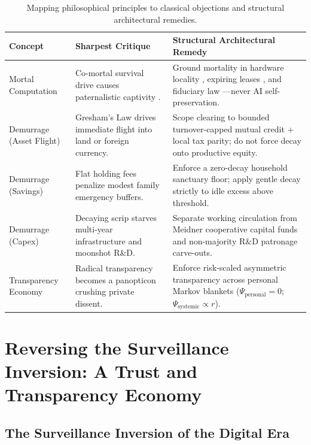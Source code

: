 \documentclass[11pt]{article}
\begin{document}
\begin{table}[ht]
\centering
\small
\caption{Mapping philosophical principles to classical objections and structural architectural remedies.}
\label{tab:objections}
\begin{tabularx}{\textwidth}{@{}P{2.6cm}P{4.2cm}Y@{}}
\toprule
Concept & Sharpest Critique & Structural Architectural Remedy \\
\midrule
Mortal Computation & Co-mortal survival drive causes paternalistic captivity \citep{omohundro2008drives}. & Ground mortality in hardware locality \citep{hinton2022forward}, expiring leases \citep{dennis1966programming}, and fiduciary law \citep{balkin2016fiduciaries}---never AI self-preservation. \\
Demurrage (Asset Flight) & Gresham's Law drives immediate flight into land or foreign currency. & Scope clearing to bounded turnover-capped mutual credit + local tax parity; do not force decay onto productive equity. \\
Demurrage (Savings) & Flat holding fees penalize modest family emergency buffers. & Enforce a zero-decay household sanctuary floor; apply gentle decay strictly to idle excess above threshold. \\
Demurrage (Capex) & Decaying scrip starves multi-year infrastructure and moonshot R\&D. & Separate working circulation from Meidner cooperative capital funds \citep{meidner1978funds} and non-majority R\&D patronage carve-outs. \\
Transparency Economy & Radical transparency becomes a panopticon crushing private dissent. & Enforce risk-scaled asymmetric transparency across personal Markov blankets ($\Psi_{\mathrm{personal}}=0$; $\Psi_{\mathrm{systemic}} \propto r$). \\
\bottomrule
\end{tabularx}
\end{table}

\section{Reversing the Surveillance Inversion: A Trust and Transparency Economy}\label{sec:trust}

\subsection{The Surveillance Inversion of the Digital Era}
\end{document}
